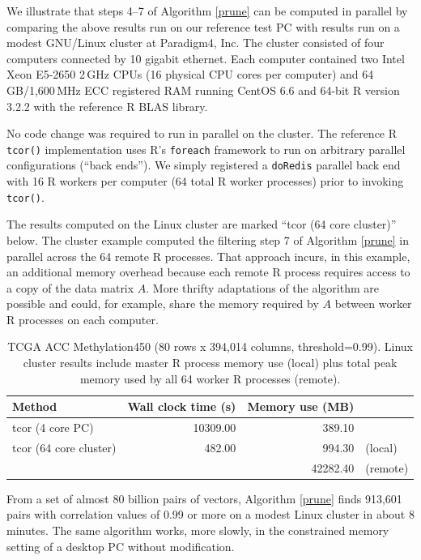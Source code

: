 \documentclass{article}
\let\proglang=\textsf
\numberwithin{algorithmctr}{section}
\begin{document}
We illustrate that steps 4--7 of Algorithm \ref{prune} can be computed in
parallel by comparing the above results run on our reference test PC with
results run on a modest GNU/Linux cluster at Paradigm4, Inc. The cluster
consisted of four computers connected by 10 gigabit ethernet. Each computer
contained two Intel Xeon E5-2650 2$\,$GHz CPUs (16 physical CPU cores per
computer) and 64$\,$GB/1,600$\,$MHz ECC registered RAM running CentOS 6.6 and
64-bit \proglang{R} version 3.2.2 with the reference \proglang{R} BLAS library.

No code change was required to run in parallel on the cluster. The reference
\proglang{R} {\tt tcor()} implementation uses \proglang{R}'s {\tt foreach}
\cite{foreach} framework to run on arbitrary parallel configurations (``back
ends''). We simply registered a {\tt doRedis} \cite{doredis} parallel back end
with 16 \proglang{R} workers per computer (64 total \proglang{R} worker
processes) prior to invoking {\tt tcor()}.

The results computed on the Linux cluster are marked ``tcor (64 core cluster)''
below. The cluster example computed the filtering step 7 of Algorithm
\ref{prune} in parallel across the 64 remote \proglang{R} processes. That
approach incurs, in this example, an additional memory overhead because each
remote \proglang{R} process requires access to a copy of the data matrix $A$.
More thrifty adaptations of the algorithm are possible and could, for example,
share the memory required by $A$ between worker \proglang{R} processes on each
computer.

\begin{table}[ht]
\centering
\begingroup\small
\begin{tabular}{lrrl}
  \hline
Method & Wall clock time (s) & Memory use (MB) &   \\ 
  \hline
tcor (4 core PC) & 10309.00 & 389.10 &  \\ 
  tcor (64 core cluster) & 482.00 & 994.30 & (local) \\ 
   &  & 42282.40 & (remote) \\ 
   \hline
\end{tabular}
\endgroup
\caption{TCGA ACC Methylation450 (80 rows x 394,014 columns, threshold=0.99). Linux cluster results include master R process memory use (local) plus total peak memory used by all 64 worker R processes (remote).} 
\label{TCGA3}
\end{table}From a set of almost 80 billion pairs of vectors, Algorithm \ref{prune} finds 913,601
pairs with correlation values of 0.99 or more on a modest Linux
cluster in about 8 minutes. The same algorithm works, more slowly, in
the constrained memory setting of a desktop PC without modification.
\end{document}
